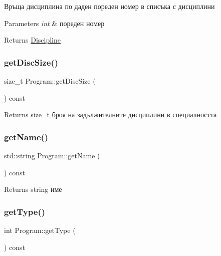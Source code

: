 Връща дисциплина по даден пореден номер в списъка с дисциплини 


\begin{DoxyParams}{Parameters}
{\em int} & пореден номер \\
\hline
\end{DoxyParams}
\begin{DoxyReturn}{Returns}
\hyperlink{class_discipline}{Discipline} 
\end{DoxyReturn}
\mbox{\label{class_program_a3e9f88ff8d80a2207b8171c8cb05a571}} 
\subsubsection{\texorpdfstring{get\+Disc\+Size()}{getDiscSize()}}
{\footnotesize\ttfamily size\+\_\+t Program\+::get\+Disc\+Size (\begin{DoxyParamCaption}{ }\end{DoxyParamCaption}) const}

\begin{DoxyReturn}{Returns}
size\+\_\+t броя на задължителните дисциплини в специалността 
\end{DoxyReturn}
\mbox{\label{class_program_af1a166f11ed6c82c7377cc67085daf1f}} 
\subsubsection{\texorpdfstring{get\+Name()}{getName()}}
{\footnotesize\ttfamily std\+::string Program\+::get\+Name (\begin{DoxyParamCaption}{ }\end{DoxyParamCaption}) const}

\begin{DoxyReturn}{Returns}
string име 
\end{DoxyReturn}
\mbox{\label{class_program_a6dac45bcf5137b89bbd3a7ef77adab49}} 
\subsubsection{\texorpdfstring{get\+Type()}{getType()}}
{\footnotesize\ttfamily int Program\+::get\+Type (\begin{DoxyParamCaption}{ }\end{DoxyParamCaption}) const}


